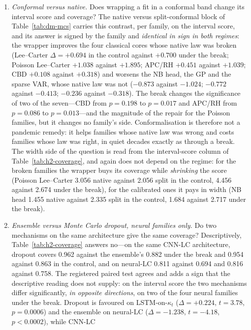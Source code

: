 \begin{enumerate}
\item \emph{Conformal versus native.} Does wrapping a fit in a conformal
  band change its interval score and coverage? The native versus
  split-conformal block of Table~\ref{tab:dm-mcs} carries this contrast,
  per family, on the interval score, and its answer is signed by the
  family and \emph{identical in sign in both regimes}: the wrapper
  improves the four classical cores whose native law was broken
  (Lee--Carter $\Delta=+0.694$ in the control against $+0.700$ under the
  break; Poisson Lee--Carter $+1.038$ against $+1.895$; APC/RH $+0.451$
  against $+1.039$; CBD $+0.108$ against $+0.318$) and worsens the NB
  head, the GP and the sparse VAR, whose native law was not ($-0.873$
  against $-1.024$; $-0.772$ against $-0.413$; $-0.236$ against
  $-0.318$). The break changes the significance of two of the seven---CBD
  from $p=0.198$ to $p=0.017$ and APC/RH from $p=0.086$ to $p=0.013$---and
  the magnitude of the repair for the Poisson families, but it changes no
  family's side. Conformalisation is therefore not a pandemic remedy: it
  helps families whose native law was wrong and costs families whose law
  was right, in quiet decades exactly as through a break. The width side
  of the question is read from the interval-score column of
  Table~\ref{tab:h2-coverage}, and again does not depend on the regime:
  for the broken families the wrapper buys its coverage while
  \emph{shrinking} the score (Poisson Lee--Carter 3.056 native against
  2.056 split in the control, 4.456 against 2.674 under the break), for
  the calibrated ones it pays in width (NB head 1.455 native against 2.335
  split in the control, 1.684 against 2.717 under the break).
\item \emph{Ensemble versus Monte Carlo dropout, neural families only.} Do
  two mechanisms on the same architecture give the same coverage?
  Descriptively, Table~\ref{tab:h2-coverage} answers no---on the same
  CNN-LC architecture, dropout covers 0.962 against the ensemble's 0.882
  under the break and 0.954 against 0.863 in the control, and on neural-LC
  0.811 against 0.694 and 0.816 against 0.758. The registered paired test
  agrees and adds a sign that the descriptive reading does not supply: on
  the interval score the two mechanisms differ significantly, \emph{in
  opposite directions}, on two of the four neural families under the
  break. Dropout is favoured on LSTM-on-$\kappa_t$ ($\Delta = +0.224$,
  $t = 3.78$, $p = 0.0006$) and the ensemble on neural-LC
  ($\Delta = -1.238$, $t = -4.18$, $p < 0.0002$), while CNN-LC

\end{enumerate}
